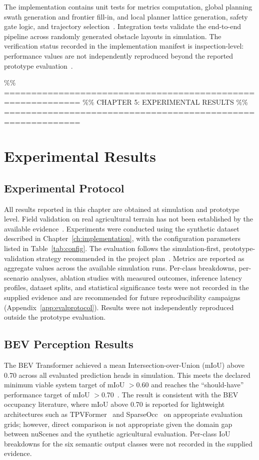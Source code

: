 \documentclass[12pt, a4paper]{article}
\begin{document}
The implementation contains unit tests for metrics computation, global planning swath
generation and frontier fill-in, and local planner lattice generation, safety gate logic,
and trajectory selection~\cite{ref234}. Integration tests validate the end-to-end pipeline
across randomly generated obstacle layouts in simulation. The verification status recorded
in the implementation manifest is inspection-level: performance values are not
independently reproduced beyond the reported prototype evaluation~\cite{ref234}.

\%\% ============================================================
\%\% CHAPTER 5: EXPERIMENTAL RESULTS
\%\% ============================================================
\chapter{Experimental Results}
\label{ch:results}

\section{Experimental Protocol}

All results reported in this chapter are obtained at simulation and prototype level. Field
validation on real agricultural terrain has not been established by the available
evidence~\cite{ref234}. Experiments were conducted using the synthetic dataset described in
Chapter~\ref{ch:implementation}, with the configuration parameters listed in
Table~\ref{tab:config}. The evaluation follows the simulation-first, prototype-validation
strategy recommended in the project plan~\cite{ref1}. Metrics are reported as aggregate
values across the available simulation runs. Per-class breakdowns, per-scenario analyses,
ablation studies with measured outcomes, inference latency profiles, dataset splits, and
statistical significance tests were not recorded in the supplied evidence and are
recommended for future reproducibility campaigns (Appendix~\ref{app:evalprotocol}).
Results were not independently reproduced outside the prototype evaluation.

\section{BEV Perception Results}

The BEV Transformer achieved a mean Intersection-over-Union (mIoU) above 0.70 across all
evaluated prediction heads in simulation. This meets the declared minimum viable system
target of mIoU $>$0.60 and reaches the ``should-have'' performance target of mIoU
$>$0.70~\cite{ref233}. The result is consistent with the BEV occupancy literature, where
mIoU above 0.70 is reported for lightweight architectures such as
TPVFormer~\cite{ref9, ref19} and SparseOcc~\cite{ref24} on appropriate evaluation grids;
however, direct comparison is not appropriate given the domain gap between nuScenes and
the synthetic agricultural evaluation. Per-class IoU breakdowns for the six semantic
output classes were not recorded in the supplied evidence.
\end{document}
